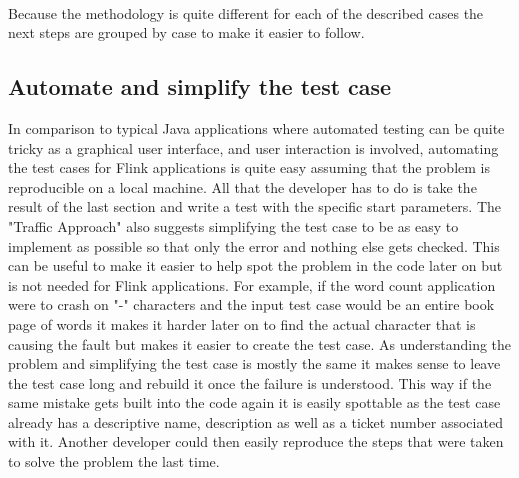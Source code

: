 \paragraph{} Because the methodology is quite different for each of the described cases the next steps are grouped by case to make it easier to follow.


\subsection{Automate and simplify the test case}
In comparison to typical Java applications where automated testing can be quite tricky as a graphical user interface, and user interaction is involved, automating the test cases for Flink applications is quite easy assuming that the problem is reproducible on a local machine. All that the developer has to do is take the result of the last section and write a test with the specific start parameters. The "Traffic Approach" also suggests simplifying the test case to be as easy to implement as possible so that only the error and nothing else gets checked. This can be useful to make it easier to help spot the problem in the code later on but is not needed for Flink applications. For example, if the word count application were to crash on "-" characters and the input test case would be an entire book page of words it makes it harder later on to find the actual character that is causing the fault but makes it easier to create the test case. As understanding the problem and simplifying the test case is mostly the same it makes sense to leave the test case long and rebuild it once the failure is understood. This way if the same mistake gets built into the code again it is easily spottable as the test case already has a descriptive name, description as well as a ticket number associated with it. Another developer could then easily reproduce the steps that were taken to solve the problem the last time.

